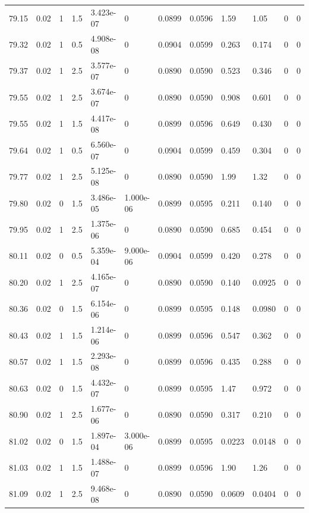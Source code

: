 \documentclass[preview]{standalone}
\begin{document}
{{{{{{{{{{{{{{{{\begin{tabular}{L{1.2cm}C{1.2cm} C{0.3cm}C{0.5cm} C{1.4cm}C{1.4cm} C{1.4cm}C{1.4cm} C{1.6cm}C{1.6cm} C{1.6cm}C{1.6cm}}
  79.15  &  0.02  & 1     & 1.5 &  3.423e-07  & 0  &  0.0899&   0.0596& 1.59 & 1.05   &  0 & 0  \\ 
  79.32  &  0.02  & 1     & 0.5 &  4.908e-08  & 0  &  0.0904&   0.0599& 0.263 & 0.174   &  0 & 0  \\ 
  79.37  &  0.02  & 1     & 2.5 &  3.577e-07  & 0  &  0.0890&   0.0590& 0.523 & 0.346   &  0 & 0  \\ 
  79.55  &  0.02  & 1     & 2.5 &  3.674e-07  & 0  &  0.0890&   0.0590& 0.908 & 0.601   &  0 & 0  \\ 
  79.55  &  0.02  & 1     & 1.5 &  4.417e-08  & 0  &  0.0899&   0.0596& 0.649 & 0.430   &  0 & 0  \\ 
  79.64  &  0.02  & 1     & 0.5 &  6.560e-07  & 0  &  0.0904&   0.0599& 0.459 & 0.304   &  0 & 0  \\ 
  79.77  &  0.02  & 1     & 2.5 &  5.125e-08  & 0  &  0.0890&   0.0590& 1.99 & 1.32   &  0 & 0  \\ 
  79.80  &  0.02  & 0     & 1.5 &  3.486e-05  & 1.000e-06  &  0.0899&   0.0595& 0.211 & 0.140   &  0 & 0  \\ 
  79.95  &  0.02  & 1     & 2.5 &  1.375e-06  & 0  &  0.0890&   0.0590& 0.685 & 0.454   &  0 & 0  \\ 
  80.11  &  0.02  & 0     & 0.5 &  5.359e-04  & 9.000e-06  &  0.0904&   0.0599& 0.420 & 0.278   &  0 & 0  \\ 
  80.20  &  0.02  & 1     & 2.5 &  4.165e-07  & 0  &  0.0890&   0.0590& 0.140 & 0.0925   &  0 & 0  \\ 
  80.36  &  0.02  & 0     & 1.5 &  6.154e-06  & 0  &  0.0899&   0.0595& 0.148 & 0.0980   &  0 & 0  \\ 
  80.43  &  0.02  & 1     & 1.5 &  1.214e-06  & 0  &  0.0899&   0.0596& 0.547 & 0.362   &  0 & 0  \\ 
  80.57  &  0.02  & 1     & 1.5 &  2.293e-08  & 0  &  0.0899&   0.0596& 0.435 & 0.288   &  0 & 0  \\ 
  80.63  &  0.02  & 0     & 1.5 &  4.432e-07  & 0  &  0.0899&   0.0595& 1.47 & 0.972   &  0 & 0  \\ 
  80.90  &  0.02  & 1     & 2.5 &  1.677e-06  & 0  &  0.0890&   0.0590& 0.317 & 0.210   &  0 & 0  \\ 
  81.02  &  0.02  & 0     & 1.5 &  1.897e-04  & 3.000e-06  &  0.0899&   0.0595& 0.0223 & 0.0148   &  0 & 0  \\ 
  81.03  &  0.02  & 1     & 1.5 &  1.488e-07  & 0  &  0.0899&   0.0596& 1.90 & 1.26   &  0 & 0  \\ 
  81.09  &  0.02  & 1     & 2.5 &  9.468e-08  & 0  &  0.0890&   0.0590& 0.0609 & 0.0404   &  0 & 0  \\ 

\end{tabular}}}}}}}}}}}}}}}}}
\end{document}
